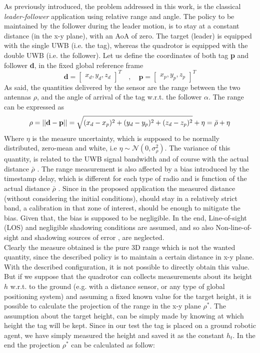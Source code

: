 As previously introduced, the problem addressed in this work, is the classical \textit{leader-follower} application using relative range and angle. The policy to be maintained by the follower during the leader motion, is to stay at a constant distance (in the x-y plane), with an AoA of zero. The target (leader) is equipped with the single UWB (i.e. the tag), whereas the quadrotor is equipped with the double UWB (i.e. the follower). Let us define the coordinates of both tag \textbf{p} and follower \textbf{d}, in the fixed global reference frame
\begin{equation}
\textbf{d} = \begin{bmatrix} x_d,y_d,z_d\end{bmatrix}^T \quad , \quad \textbf{p} = \begin{bmatrix} x_p,y_p,z_p\end{bmatrix}^T
\end{equation}
As said, the quantities delivered by the sensor are the range between the two antennas \textbf{$\rho$}, and the angle of arrival of the tag w.r.t. the follower \textbf{$\alpha$}. The range can be expressed as
\begin{equation}
    \rho = ||\mathbf{d} - \mathbf{p}||=\sqrt{(x_d - x_p)^2 + (y_d - y_p)^2 + (z_d - z_p)^2} + \eta = \Bar{\rho} + \eta
\end{equation}
Where $\eta$ is the measure uncertainty, which is supposed to be normally distributed, zero-mean and white, i.e $\eta \sim \mathcal{N}(0,\sigma_{\rho}^2)$. The variance of this quantity, is related to the UWB signal bandwidth and of course with the actual distance $\bar{\rho}$ \cite{uwb_variance}. The range measurement is also affected by a bias introduced by the timestamp delay, which is different for each type of radio and is function of the actual distance $\bar{\rho}$ \cite{UWBEvaluationOP}. Since in the proposed application the measured distance (without considering the initial conditions), should stay in a relatively strict band, a calibration in that zone of interest, should be enough to mitigate the bias. Given that, the bias is supposed to be negligible. In the end, Line-of-sight (LOS) and negligible shadowing conditions are assumed, and so also Non-line-of-sight and shadowing sources of error \cite{UWBHumshadowing}, are neglected.\\
Clearly the measure obtained is the pure 3D range which is not the wanted quantity, since the described policy is to maintain a certain distance in x-y plane. With the described configuration, it is not possible to directly obtain this value. But if we suppose that the quadrotor can collects measurements about its height $h$ w.r.t. to the ground (e.g. with a distance sensor, or any type of global positioning system) and assuming a fixed known value for the target height, it is possible to calculate the projection of the range in the x-y plane $\rho^*$. The assumption about the target height, can be simply made by knowing at which height the tag will be kept. Since in our test the tag is placed on a ground robotic agent, we have simply measured the height and saved it as the constant $h_t$. In the end the projection $\rho^*$ can be calculated as follow:
